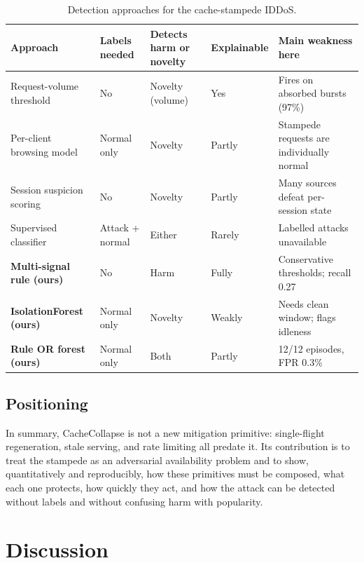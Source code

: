 \documentclass[preprint,12pt]{elsarticle}
\begin{document}
\begin{table}[t]
\centering
\caption{Detection approaches for the cache-stampede IDDoS.}
\label{tab:detcompare}
\footnotesize
\begin{tabularx}{\linewidth}{@{}L{3.2cm}L{1.7cm}L{1.8cm}L{1.8cm}Y@{}}
\toprule
Approach & Labels needed & Detects harm or novelty & Explainable & Main weakness here \\
\midrule
Request-volume threshold & No & Novelty (volume) & Yes & Fires on absorbed bursts (97\%) \\
Per-client browsing model \cite{xie2009} & Normal only & Novelty & Partly & Stampede requests are individually normal \\
Session suspicion scoring \cite{ranjan2009} & No & Novelty & Partly & Many sources defeat per-session state \\
Supervised classifier & Attack + normal & Either & Rarely & Labelled attacks unavailable \\
\textbf{Multi-signal rule (ours)} & No & Harm & Fully & Conservative thresholds; recall 0.27 \\
\textbf{IsolationForest (ours)} & Normal only & Novelty & Weakly & Needs clean window; flags idleness \\
\textbf{Rule OR forest (ours)} & Normal only & Both & Partly & 12/12 episodes, FPR 0.3\% \\
\bottomrule
\end{tabularx}
\end{table}

\subsection{Positioning}
In summary, CacheCollapse is not a new mitigation primitive: single-flight
regeneration, stale serving, and rate limiting all predate it. Its contribution is to
treat the stampede as an adversarial availability problem and to show,
quantitatively and reproducibly, how these primitives must be composed, what each one
protects, how quickly they act, and how the attack can be detected without labels and
without confusing harm with popularity.

\section{Discussion}
\label{sec:discussion}
\end{document}
